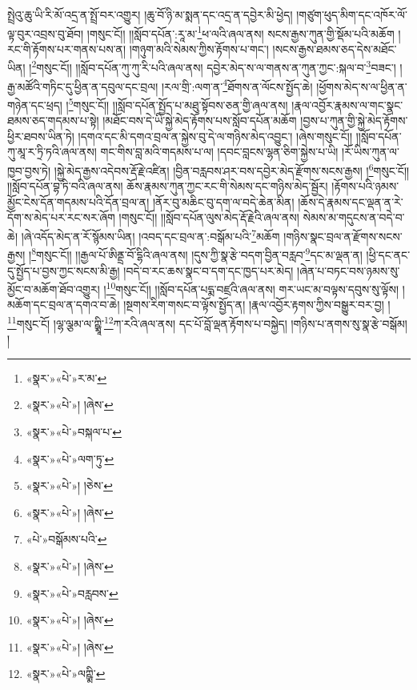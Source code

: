 སྤྲེའུ་ཆུ་ཡི་རི་མོ་འདྲ་ན་སྤྲོ་བར་འགྱུར། །ཆུ་བོ་ཉི་མ་སྨན་དང་འདྲ་ན་དབྱེར་མི་ཕྱེད། །གཙུག་ཕུད་མིག་དང་འཁོར་ལོ་ལྟ་བུར་འབྲས་བུ་ཐོབ། །གསུང་ངོ།། །།སློབ་དཔོན་:རཱ་མ་\footnote{«སྣར་»«པེ་»ར་མ་}ཕ་ལའི་ཞལ་ནས། སངས་རྒྱས་ཀུན་གྱི་སྡོམ་པའི་མཆོག །རང་གི་རྟོགས་པར་གནས་པས་ན། །གཉུག་མའི་སེམས་ཀྱིས་རྟོགས་པ་གང་། །སངས་རྒྱས་ཐམས་ཅད་དེས་མཐོང་ཡིན། །\footnote{«སྣར་»«པེ་»། །ཞེས་}གསུང་ངོ།། །།སློབ་དཔོན་ཀུ་ཀུ་རི་པའི་ཞལ་ནས། དབྱེར་མེད་ས་ལ་གནས་ན་ཀུན་ཀྱང་:སྐལ་བ་\footnote{«སྣར་»«པེ་»བསྐལ་པ་}བཟང་། །རྒྱ་མཚོའི་གཏིང་དུ་ཕྱིན་ན་དབུལ་དང་བྲལ། །རལ་གྲི་:ལག་ན་\footnote{«སྣར་»«པེ་»ལག་ཏུ་}ཐོགས་ན་ལོངས་སྤྱོད་ཆེ། །ཕྱོགས་མེད་ས་ལ་ཕྱིན་ན་གཉེན་དང་ཕྲད། །\footnote{«སྣར་»«པེ་»། །ཅེས་}གསུང་ངོ།། །།སློབ་དཔོན་སྤྱོད་པ་མཐུ་སྟོབས་ཅན་གྱི་ཞལ་ནས། །རྣལ་འབྱོར་རྣམས་ལ་གང་སྣང་ཐམས་ཅད་གདམས་པ་སྟེ། །མཐོང་བས་དེ་ཡི་སྐྱེ་མེད་རྟོགས་པས་སློབ་དཔོན་མཆོག །བྱས་པ་ཀུན་གྱི་སྐྱེ་མེད་རྟོགས་ཕྱིར་ཐབས་ཡིན་ཏེ། །དགའ་དང་མི་དགའ་བྲལ་ན་སྐྱེས་བུ་དེ་ལ་གཉིས་མེད་འབྱུང་། །ཞེས་གསུང་ངོ།། །།སློབ་དཔོན་ཀུ་མཱ་ར་ཏྲི་ཏའི་ཞལ་ནས། གང་གིས་བླ་མའི་གདམས་པ་ལ། །དབང་བླངས་ལྷན་ཅིག་སྐྱེས་པ་ཡི། །རོ་ཡིས་ཀུན་ལ་ཁྱབ་བྱས་ཏེ། །སྐྱེ་མེད་རྒྱས་འདེབས་རྡོ་རྗེ་འཛིན། །བྱིན་བརླབས་ཤར་བས་དབྱེར་མེད་རྫོགས་སངས་རྒྱས། །\footnote{«སྣར་»«པེ་»། །ཞེས་}གསུང་ངོ།། །།སློབ་དཔོན་བྷ་ཏི་བའི་ཞལ་ནས། ཆོས་རྣམས་ཀུན་ཀྱང་རང་གི་སེམས་དང་གཉིས་མེད་སྦྱོར། །རྟོགས་པའི་ཉམས་མྱོང་ངེས་དོན་གདམས་པའི་དོན་བྲལ་ན། །ནོར་བུ་མཆིང་བུ་དག་ལ་བདེ་ཆེན་མིན། །ཆོས་དེ་རྣམས་དང་ལྡན་ན་རེ་དོག་ས་མེད་པར་རང་སར་ཞོག །གསུང་ངོ།། །།སློབ་དཔོན་ལུས་མེད་རྡོ་རྗེའི་ཞལ་ནས། སེམས་མ་གདུངས་ན་བདེ་བ་ཆེ། །ཞེ་འདོད་མེད་ན་རོ་སྙོམས་ཡིན། །འབད་དང་བྲལ་ན་:བསྒོམ་པའི་\footnote{«པེ་»བསྒོམས་པའི་}མཆོག །གཉིས་སྣང་བྲལ་ན་རྫོགས་སངས་རྒྱས། །\footnote{«སྣར་»«པེ་»། །ཞེས་}གསུང་ངོ།། །།རྒྱལ་པོ་ཨིནྡྲ་བོ་དྷིའི་ཞལ་ནས། །དུས་ཀྱི་སྣ་རྩེ་བདག་བྱིན་བརླབ་\footnote{«སྣར་»«པེ་»བརླབས་}དང་མ་ལྡན་ན། །ཕྱི་དང་ནང་དུ་སྤྱོད་པ་བྱས་ཀྱང་སངས་མི་རྒྱ། །བདེ་བ་རང་ཆས་སྣང་བ་དག་དང་ཁྱད་པར་མེད། །ཞེན་པ་བཏང་བས་ཉམས་སུ་མྱོང་བ་མཆོག་ཐོབ་འགྱུར། །\footnote{«སྣར་»«པེ་»། །ཞེས་}གསུང་ངོ།། །།སློབ་དཔོན་པདྨ་བཛྲའི་ཞལ་ནས། གར་ཡང་མ་བལྟས་དབུས་སུ་ལྟོས། །མཆོག་དང་བྲལ་ན་དགའ་བ་ཆེ། །སྔགས་རིག་གསང་བ་ལྟོས་སྤྱོད་ན། །རྣལ་འབྱོར་རྟགས་ཀྱིས་བསྒྱུར་བར་བྱ། །\footnote{«སྣར་»«པེ་»། །ཞེས་}གསུང་ངོ། །ལྷ་ལྕམ་ལ་ཀྵྨཱི་\footnote{«སྣར་»«པེ་»ལཀྵྨི་}ཀ་རའི་ཞལ་ནས། དང་པོ་བློ་ལྡན་རྟོགས་པ་བསྐྱེད། །གཉིས་པ་ནགས་སུ་སྣ་རྩེ་བསྒོམ། །
